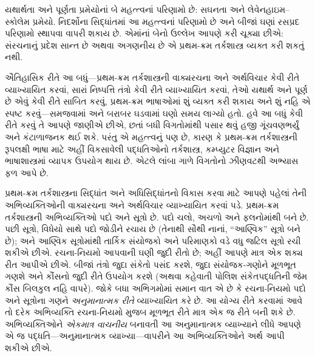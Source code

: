 યથાર્થતા અને પૂર્ણતા પ્રમેયોનાં બે મહત્ત્વનાં પરિણામો છે: સઘનતા અને
લેવેનહાઇમ--સ્કોલેમ પ્રમેયો. નિદર્શોના સિદ્ધાંતમાં આ મહત્ત્વનાં
પરિણામો છે અને બીજાં ઘણાં રસપ્રદ પરિણામો સ્થાપવા વાપરી શકાય છે. એમાંનાં
બેનો ઉલ્લેખ આપણે કરી ચૂક્યા છીએ: સંરચનાનું પ્રદેશ સાન્ત છે
અથવા અગણનીય છે એ પ્રથમ-ક્રમ તર્કશાસ્ત્ર વ્યક્ત કરી શકતું
નથી.

ઐતિહાસિક રીતે આ બધું---પ્રથમ-ક્રમ તર્કશાસ્ત્રની વાક્યરચના અને
અર્થવિચાર કેવી રીતે વ્યાખ્યાયિત કરવાં, સારાં નિષ્પત્તિ તંત્રો
કેવી રીતે વ્યાખ્યાયિત કરવાં, તેઓ યથાર્થ અને પૂર્ણ છે એવું કેવી રીતે
સાબિત કરવું, પ્રથમ-ક્રમ ભાષાઓમાં શું વ્યક્ત કરી શકાય અને શું નહિ એ
સ્પષ્ટ કરવું---સમજવામાં અને બરાબર ઘડવામાં ઘણો સમય લાગ્યો હતો. હવે આ
બધું કેવી રીતે કરવું તે આપણે જાણીએ છીએ, છતાં બધી વિગતોમાંથી પસાર થવું
હજી ગૂંચવણભર્યું અને કંટાળાજનક થઈ શકે. પરંતુ એ મહત્ત્વનું પણ છે,
કારણ કે પ્રથમ-ક્રમ તર્કશાસ્ત્રની રૂપલક્ષી ભાષા માટે અહીં વિકસાવેલી
પદ્ધતિઓનો તર્કશાસ્ત્ર, કમ્પ્યુટર વિજ્ઞાન અને ભાષાશાસ્ત્રમાં વ્યાપક
ઉપયોગ થાય છે. એટલે લાંબા ગાળે વિગતોનો ઝીણવટથી અભ્યાસ ફળ આપે છે.
\endgroup


\OLEndChapterHook
\endgroup


\begingroup
\makeatletter{}\makeatother

\label{guunit:OLP-0149}


\begingroup
\makeatletter{}\makeatother


\label{guunit:OLP-0150}


પ્રથમ-ક્રમ તર્કશાસ્ત્રના સિદ્ધાંત અને અધિસિદ્ધાંતનો વિકાસ કરવા માટે
આપણે પહેલાં તેની અભિવ્યક્તિઓની વાક્યરચના અને અર્થવિચાર વ્યાખ્યાયિત
કરવાં પડે. પ્રથમ-ક્રમ તર્કશાસ્ત્રની અભિવ્યક્તિઓ પદો અને
સૂત્રો છે. પદો ચલો, અચળો અને ફલનોમાંથી
બને છે. પછી સૂત્રો, વિધેયો સાથે પદો જોડીને રચાય છે
(તેનાથી સૌથી નાનાં, ``આણ્વિક'' સૂત્રો બને છે); અને આણ્વિક
સૂત્રોમાંથી તાર્કિક સંયોજકો અને પરિમાણકો વડે વધુ જટિલ સૂત્રો
રચી શકીએ છીએ. રચના-નિયમો આપવાની ઘણી જુદી રીતો છે; અહીં આપણે માત્ર
એક શક્ય રીત આપીએ છીએ. બીજાં તંત્રો જુદા સંકેતો પસંદ કરશે, જુદા
સંયોજક-ગણોને મૂળભૂત ગણશે અને કૌંસનો જુદી રીતે ઉપયોગ કરશે (અથવા
કહેવાતી પોલિશ સંકેતપદ્ધતિની જેમ કૌંસ બિલકુલ નહિ વાપરે). જોકે બધા
અભિગમોમાં સમાન વાત એ છે કે રચના-નિયમો પદો અને સૂત્રોના ગણને
\emph{અનુમાનાત્મક રીતે} વ્યાખ્યાયિત કરે છે. આ યોગ્ય રીતે કરવામાં આવે
તો દરેક અભિવ્યક્તિ રચના-નિયમો મુજબ મૂળભૂત રીતે માત્ર એક જ રીતે બની
શકે છે. અભિવ્યક્તિઓને \emph{એકમાત્ર વાચનીય} બનાવતી આ
અનુમાનાત્મક વ્યાખ્યાને લીધે આપણે એ જ પદ્ધતિ---અનુમાનાત્મક
વ્યાખ્યા---વાપરીને આ અભિવ્યક્તિઓને અર્થ આપી શકીએ છીએ.
\endgroup


